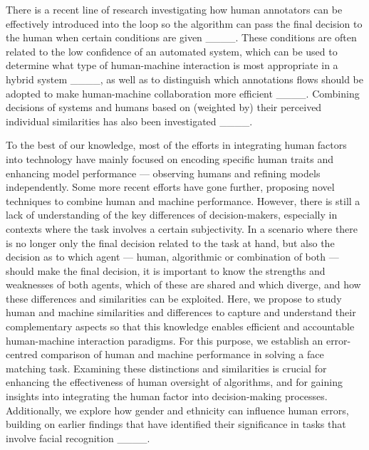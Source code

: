 There is a recent line of research investigating how human annotators can be effectively introduced into the loop so the algorithm can pass the final decision to the human when certain conditions are given ____. These conditions are often related to the low confidence of an automated system, which can be used to determine what type of human-machine interaction is most appropriate in a hybrid system ____, as well as to distinguish which annotations flows should be adopted to make human-machine collaboration more efficient ____. Combining decisions of systems and humans based on (weighted by) their perceived individual similarities has also been investigated ____.

\bigskip
To the best of our knowledge, most of the efforts in integrating human factors into technology have mainly focused on encoding specific human traits and enhancing model performance — observing humans and refining models independently. Some more recent efforts have gone further, proposing novel techniques to combine human and machine performance. However, there is still a lack of understanding of the key differences of decision-makers, especially in contexts where the task involves a certain subjectivity. In a scenario where there is no longer only the final decision related to the task at hand, but also the decision as to which agent — human, algorithmic or combination of both — should make the final decision, it is important to know the strengths and weaknesses of both agents, which of these are shared and which diverge, and how these differences and similarities can be exploited. Here, we propose to study human and machine similarities and differences to capture and understand their complementary aspects so that this knowledge enables efficient and accountable human-machine interaction paradigms.
%
For this purpose, we establish an error-centred comparison of human and machine performance in solving a face matching task. Examining these distinctions and similarities is crucial for enhancing the effectiveness of human oversight of algorithms, and for gaining insights into integrating the human factor into decision-making processes. Additionally, we explore how gender and ethnicity can influence human errors, building on earlier findings that have identified their significance in tasks that involve facial recognition ____.